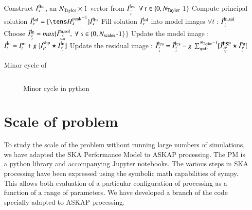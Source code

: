 \documentclass[11pt,a4paper,variablewidth]{article}
\begin{document}
\begin{algorithm}
  \SetLine
  \linesnumbered
  \dontprintsemicolon
    {
     {
       {
          Construct ${\vec{I}}^{\rm rhs}_s$, an $N_{\rm Taylor} \times 1$ vector from ${\vec{I}}^{\rm res}_{{s}\atop{t}} ~~\forall ~ t \in \{0,N_{\rm Taylor} $-$1\}$\;
          Compute principal solution $\I^{\rm sol}_s = [{\He^{\rm peak}_s}^{-1}] \I^{\rm rhs}_s$\;
          Fill solution ${\vec{I}}^{\rm sol}_s$ into model images $\forall t$ : ${\vec{I}}^{\rm m,sol}_{{s}\atop{t}}$
       }
     }
     Choose ${\vec{I}}^{\rm m}_{{p}\atop{t}} = max\{{\vec{I}}^{\rm m,sol}_{{s}\atop{t=0}},~\forall~s\in\{0,N_{\rm scales} $-$1\}\}$ \;
       {
        Update the model image : ${\vec{I}}^{\rm m}_t = I^{\rm m}_t + g ~[ {\vec{I}}^{\rm shp}_{p} \star {\vec{I}}^{\rm m}_{{p}\atop{t}}]$ \;
        }
       {
	{
          Update the residual image : ${\vec{I}}^{\rm res}_{{s}\atop{t}} = {\vec{I}}^{\rm res}_{{s}\atop{t}} - g ~\sum_{q=0}^{N_{\rm Taylor} -1}[{\vec{I}}^{\rm PSF}_{{sp}\atop{tq}} \star {\vec{I}}^{\rm m}_{{p}\atop{t}}]$\;
	}
       }
    }
\caption[Minor cycle of \MAM\ Algorithm]
         {Minor cycle of \MAM}\label{algo:ASKAP}
\label{alg:minor_cycle_UC2011}
\end{algorithm}

\begin{figure}
\begin{tcolorbox}
\inputminted{python}{minor_cycle.py}
\end{tcolorbox}
\caption{Minor cycle in python}
\label{fig:minor_cycle_python}
\end{figure}

\clearpage

\pagebreak
\section{Scale of problem}

To study the scale of the problem without running large numbers of simulations, we have adapted the SKA Performance Model to ASKAP processing. The PM is a python library and accompanying Jupyter notebooks. The various steps in SKA processing have been expressed using the symbolic math capabilities of sympy. This allows both evaluation of a particular configuration of processing as a function of a range of parameters. We have developed a branch of the code specially adapted to ASKAP processing.
\end{document}
